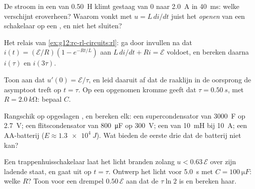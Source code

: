 \begin{exercise}[$\star\star$]\label{exo:g12:rc-rl-circuits:9}
De stroom in een  van \qty{0.50}{H} klimt gestaag van $0$ naar
\qty{2.0}{A} in \qty{40}{ms}: welke  verschijnt eroverheen? Waarom
vonkt met $u = L\,di/dt$ juist het \emph{openen} van een schakelaar op een
, en niet het sluiten?
\end{exercise}

\begin{exercise}[$\star\star$]\label{exo:g12:rc-rl-circuits:10}
Het relais van \cref{ex:g12:rc-rl-circuits:rl}: ga door invullen na dat
$i(t) = (\mathcal{E}/R)(1 - e^{-Rt/L})$ aan $L\,di/dt + Ri = \mathcal{E}$
voldoet, en bereken daarna $i(\tau)$ en $i(3\tau)$.
\end{exercise}

\begin{exercise}[$\star\star$]\label{exo:g12:rc-rl-circuits:11}
Toon aan dat $u'(0) = \mathcal{E}/\tau$, en leid daaruit af dat de raaklijn in
de oorsprong de asymptoot treft op $t = \tau$. Op een opgenomen kromme geeft
dat $\tau = \qty{0.50}{s}$, met $R = \qty{2.0}{k\ohm}$: bepaal $C$.
\end{exercise}

\begin{exercise}[$\star\star\star$]\label{exo:g12:rc-rl-circuits:12}
Rangschik op opgeslagen , en bereken elk: een supercondensator van
\qty{3000}{F} op \qty{2.7}{V}; een flitscondensator van \qty{800}{\micro F} op
\qty{300}{V}; een  van \qty{10}{mH} bij \qty{10}{A}; een AA-batterij
($E \approx \qty{1.3e4}{J}$). Wat bieden de eerste drie dat de batterij niet
kan?
\end{exercise}

\begin{exercise}[$\star\star\star$]\label{exo:g12:rc-rl-circuits:13}
Een trappenhuisschakelaar laat het licht branden zolang $u < 0.63\,\mathcal{E}$
over zijn ladende  staat, en gaat uit op $t = \tau$. Ontwerp het
licht voor \qty{5.0}{s} met $C = \qty{100}{\micro F}$: welke $R$? Toon voor
een drempel $0.50\,\mathcal{E}$ aan dat de  $\tau \ln 2$ is en
bereken haar.
\end{exercise}

